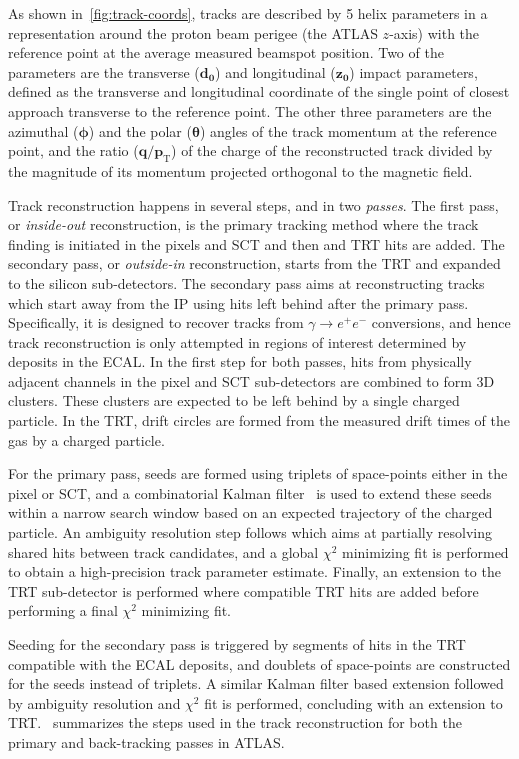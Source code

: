 As shown in~\cref{fig:track-coords}, tracks are described by 5 helix parameters in a representation around the proton beam perigee (the ATLAS $z$-axis) with the reference point at the average measured beamspot position. Two of the parameters are the transverse ($\boldsymbol{d_0}$) and longitudinal ($\boldsymbol{z_0}$) impact parameters, defined as the transverse and longitudinal coordinate of the single point of closest approach transverse to the reference point. The other three parameters are the azimuthal ($\boldsymbol{\phi}$) and the polar ($\boldsymbol{\theta}$) angles of the track momentum at the reference point, and the ratio ($\boldsymbol{q/p_\mathrm{T}}$) of the charge of the reconstructed track divided by the magnitude of its momentum projected orthogonal to the magnetic field.

Track reconstruction happens in several steps, and in two \textit{passes}. The first pass, or \textit{inside-out} reconstruction, is the primary tracking method where the track finding is initiated in the pixels and SCT and then and TRT hits are added. The secondary pass, or \textit{outside-in} reconstruction, starts from the TRT and expanded to the silicon sub-detectors. The secondary pass aims at reconstructing tracks which start away from the IP using hits left behind after the primary pass. Specifically, it is designed to recover tracks from $\gamma \to e^+e^-$ conversions, and hence track reconstruction is only attempted in regions of interest determined by deposits in the ECAL. In the first step for both passes, hits from physically adjacent channels in the pixel and SCT sub-detectors are combined to form 3D clusters. These clusters are expected to be left behind by a single charged particle. In the TRT, drift circles are formed from the measured drift times of the gas by a charged particle. 

For the primary pass, seeds are formed using triplets of space-points either in the pixel or SCT, and a combinatorial Kalman filter~\cite{FRUHWIRTH1987444} is used to extend these seeds within a narrow search window based on an expected trajectory of the charged particle. An ambiguity resolution step follows which aims at partially resolving shared hits between track candidates, and a global $\chi^2$ minimizing fit is performed to obtain a high-precision track parameter estimate. Finally, an extension to the TRT sub-detector is performed where compatible TRT hits are added before performing a final $\chi^2$ minimizing fit.

Seeding for the secondary pass is triggered by segments of hits in the TRT compatible with the ECAL deposits, and doublets of space-points are constructed for the seeds instead of triplets. A similar Kalman filter based extension followed by ambiguity resolution and $\chi^2$ fit is performed, concluding with an extension to TRT.~ summarizes the steps used in the track reconstruction for both the primary and back-tracking passes in ATLAS.

